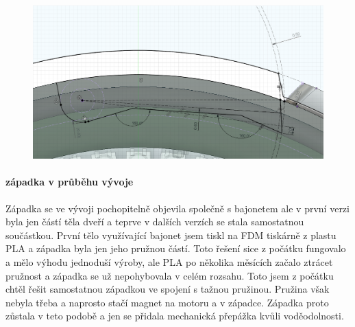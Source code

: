 \begin{figure}[htbp]
    \centering
    \includegraphics[width=\textwidth]{kapitoly/obrazky/E4/zapadka/uhel_cela.png}
    \caption{}
    \label{fig:E4-uhel_cela_zapadky}
\end{figure}

\newpage
\paragraph{západka v průběhu vývoje}

Západka se ve vývoji pochopitelně objevila společně s bajonetem ale v první verzi byla jen částí těla dveří a teprve v dalších verzích se stala
samostatnou součástkou. První tělo využívající bajonet jsem tiskl na FDM tiskárně z plastu PLA a západka byla jen jeho pružnou částí. Toto řešení sice 
z počátku fungovalo a mělo výhodu jednoduší výroby, ale PLA po několika měsících začalo ztrácet pružnost a západka se už nepohybovala v celém rozsahu.
Toto jsem z počátku chtěl řešit samostatnou západkou ve spojení s tažnou pružinou. Pružina však nebyla třeba a naprosto stačí magnet na motoru a v západce.
Západka proto zůstala v teto podobě a jen se přidala mechanická přepážka kvůli voděodolnosti. 

